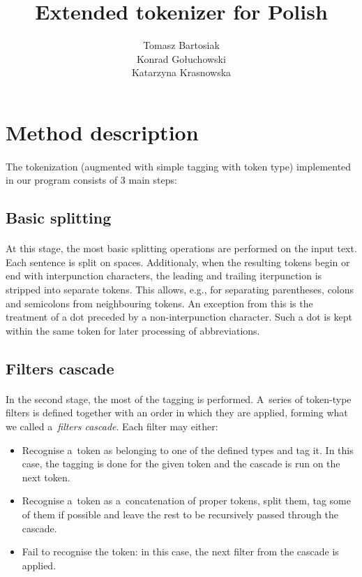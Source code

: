 \documentclass[oneside,12pt]{article}
\title{Extended tokenizer for Polish}
\author{Tomasz Bartosiak \\ Konrad Gołuchowski \\ Katarzyna Krasnowska}
\begin{document}
\maketitle

\section{Method description}

\paragraph{}
The tokenization (augmented with simple tagging with token type) implemented in our program consists of 3 main steps:

\subsection{Basic splitting}

\paragraph{}
At this stage, the most basic splitting operations are performed on the input text. Each sentence is split on spaces. Additionaly, when the resulting tokens begin or end with interpunction characters, the leading and trailing iterpunction is stripped into separate tokens. This allows, e.g., for separating parentheses, colons and semicolons from neighbouring tokens. An exception from this is the treatment of a dot preceded by a non-interpunction character. Such a dot is kept within the same token for later processing of abbreviations.

\subsection{Filters cascade}

\paragraph{}
In the second stage, the most of the tagging is performed. A~series of token-type filters is defined together with an order in which they are applied, forming what we called a~\textit{filters cascade}. Each filter may either:
    \begin{itemize}
        \item Recognise a~token as belonging to one of the defined types and tag it. In this case, the tagging is done for the given token and the cascade is run on the next token.
        \item Recognise a~token as a~concatenation of proper tokens, split them, tag some of them if possible and leave the rest to be recursively passed through the cascade.
        \item Fail to recognise the token: in this case, the next filter from the cascade is applied.
    \end{itemize}
    
\end{document}
